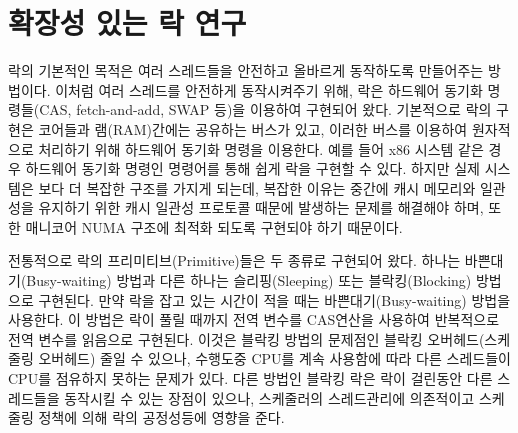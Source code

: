\newpage
\section{확장성 있는 락 연구}
\label{sec:lockrelated}

락의 기본적인 목적은 여러 스레드들을 안전하고 올바르게 동작하도록 만들어주는 방법이다.
이처럼 여러 스레드를 안전하게 동작시켜주기 위해, 락은 하드웨어 동기화 명령들(CAS,
fetch-and-add, SWAP 등)을 이용하여 구현되어 왔다. 
기본적으로 락의 구현은 코어들과 램(RAM)간에는 공유하는 버스가 있고, 이러한 버스를 이용하여 원자적으로 
처리하기 위해 하드웨어 동기화 명령을 이용한다. 
예를 들어 x86 시스템 같은 경우 하드웨어 동기화 명령인  명령어를 통해 쉽게 락을 구현할 수 있다.
하지만 실제 시스템은 보다 더 복잡한 구조를 가지게 되는데, 
복잡한 이유는 중간에 캐시 메모리와 일관성을 유지하기 위한 캐시 일관성 프로토콜 때문에 발생하는 문제를 
해결해야 하며, 또한 매니코어 NUMA 구조에 최적화 되도록 구현되야 하기 때문이다.


전통적으로 락의 프리미티브(Primitive)들은 두 종류로 구현되어 왔다.
하나는 바쁜대기(Busy-waiting) 방법과 다른 하나는 슬리핑(Sleeping) 또는 블락킹(Blocking) 방법으로 구현된다.
만약 락을 잡고 있는 시간이 적을 때는 바쁜대기(Busy-waiting) 방법을 사용한다. 
이 방법은 락이 풀릴 때까지 전역 변수를 CAS연산을 사용하여 반복적으로 전역 변수를 읽음으로 구현된다.
이것은 블락킹 방법의 문제점인 블락킹 오버헤드(스케줄링 오버헤드) 줄일 수 있으나, 
수행도중 CPU를 계속 사용함에 따라 다른 스레드들이 CPU를 점유하지 못하는 문제가 있다.
다른 방법인 블락킹 락은 락이 걸린동안 다른 스레드들을 동작시킬 수 있는 장점이 있으나, 
스케줄러의 스레드관리에 의존적이고 스케줄링 정책에 의해 락의 공정성등에 영향을 준다.

